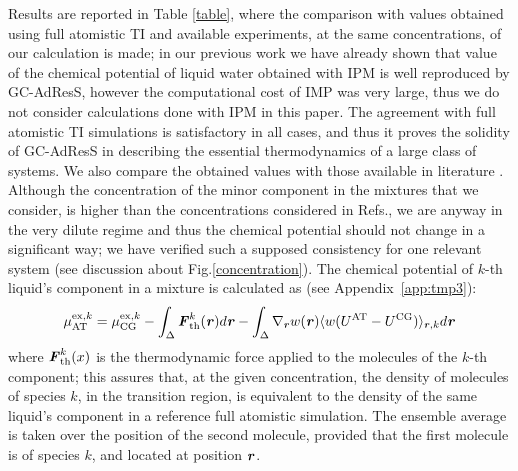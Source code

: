 \documentclass[a4paper,preprint,unsortedaddress]{revtex4-1}
\newcommand{\recheck}[1]{{\color{red} #1}}
\newcommand{\vect}[1]{\textbf{\textit{#1}}}
\newcommand{\AT}{{\textrm{{AT}}}}
\newcommand{\CG}{{\textrm{CG}}}
\newcommand{\thf}{{\textrm{th}}}
\newcommand{\exc}{{\textrm{ex}}}
\begin{document}
Results are reported in Table \ref{table}, where the comparison with values obtained using full atomistic TI and available experiments, at the same concentrations, of our calculation is made; in our previous work we have already shown that value of the chemical potential of liquid water obtained with IPM is well reproduced by GC-AdResS, however the computational cost of IMP was very large, thus we do not consider calculations done with IPM in this paper. 
The agreement with full atomistic TI simulations is satisfactory in all cases, and thus it proves the solidity of GC-AdResS in describing the essential thermodynamics of a large class of systems.
We also compare the obtained values with those available in literature \cite{vang,nico}. Although the concentration of the minor component in the mixtures that we consider, is higher than the concentrations considered in Refs.\cite{vang,nico}, we are anyway in the very dilute regime and thus the chemical potential should not change in a significant way; \recheck{we have verified  such a supposed consistency for one relevant system (see discussion about Fig.\ref{concentration})}. 
The chemical potential of $k$-th liquid's component in a mixture is calculated as \recheck{(see Appendix~\ref{app:tmp3})}:
\begin{equation}
  \mu^{\exc,k}_{\AT}=
  \mu^{\exc,k}_{\CG}-
  \int_{\Delta}{\vect F}^k_{\thf}({\vect r})d{\vect r}-
  \int_{\Delta}\nabla_{\vect r} w(\vect r) \langle w(U^{\AT}-U^{\CG})\rangle_{\vect r, k} d{\vect r}
\label{eqn:tmp25}
\end{equation}
where $\vect{F}^{k}_{\thf}(x)$ is the thermodynamic force applied to the molecules of the $k$-th component; this assures that, at the given concentration, the density of molecules of species $k$, in the transition region, is equivalent to the density of the same liquid's component in a reference full atomistic simulation.
\recheck{The ensemble average is taken over the position of the second molecule, provided that the first molecule is of species $k$, and located at position $\vect r$}.\\
\end{document}
